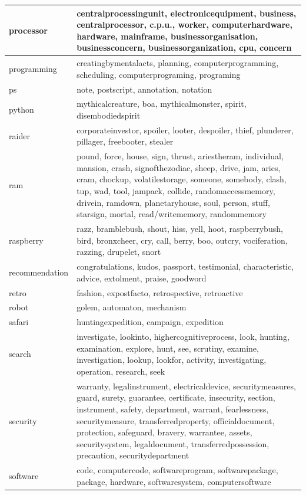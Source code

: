 \documentclass[12pt,a4paper]{report}
\begin{document}
\begin{table}[H]
\begin{center}
\begin{tabular}{|l|l|}
\hline
processor & centralprocessingunit, electronicequipment, business, centralprocessor, c.p.u., worker, computerhardware, hardware, mainframe, businessorganisation, businessconcern, businessorganization, cpu, concern\\
\hline
programming & creatingbymentalacts, planning, computerprogramming, scheduling, computerprograming, programing\\
\hline
ps & note, postscript, annotation, notation\\
\hline
python & mythicalcreature, boa, mythicalmonster, spirit, disembodiedspirit\\
\hline
raider & corporateinvestor, spoiler, looter, despoiler, thief, plunderer, pillager, freebooter, stealer\\
\hline
ram & pound, force, house, sign, thrust, ariestheram, individual, mansion, crash, signofthezodiac, sheep, drive, jam, aries, cram, chockup, volatilestorage, someone, somebody, clash, tup, wad, tool, jampack, collide, randomaccessmemory, drivein, ramdown, planetaryhouse, soul, person, stuff, starsign, mortal, read/writememory, randommemory\\
\hline
raspberry & razz, bramblebush, shout, hiss, yell, hoot, raspberrybush, bird, bronxcheer, cry, call, berry, boo, outcry, vociferation, razzing, drupelet, snort\\
\hline
recommendation & congratulations, kudos, passport, testimonial, characteristic, advice, extolment, praise, goodword\\
\hline
retro & fashion, expostfacto, retrospective, retroactive\\
\hline
robot & golem, automaton, mechanism\\
\hline
safari & huntingexpedition, campaign, expedition\\
\hline
search & investigate, lookinto, highercognitiveprocess, look, hunting, examination, explore, hunt, see, scrutiny, examine, investigation, lookup, lookfor, activity, investigating, operation, research, seek\\
\hline
security & warranty, legalinstrument, electricaldevice, securitymeasures, guard, surety, guarantee, certificate, insecurity, section, instrument, safety, department, warrant, fearlessness, securitymeasure, transferredproperty, officialdocument, protection, safeguard, bravery, warrantee, assets, securitysystem, legaldocument, transferredpossession, precaution, securitydepartment\\
\hline
software & code, computercode, softwareprogram, softwarepackage, package, hardware, softwaresystem, computersoftware\\

\end{tabular}
\end{center}
\end{table}
\end{document}
